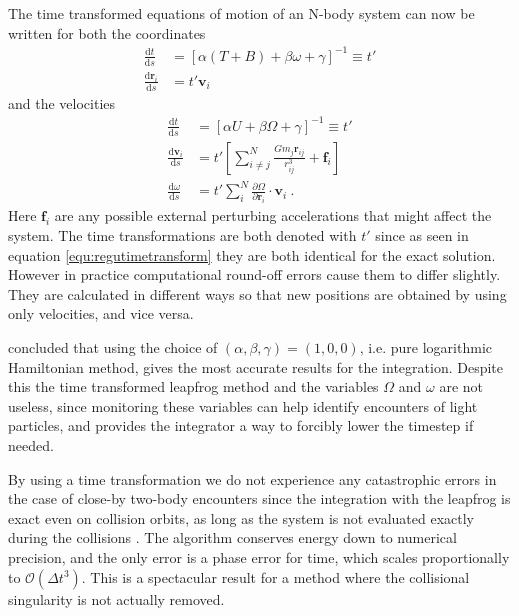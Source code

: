 \documentclass[english, oneside]{HYgradu}
\begin{document}
The time transformed equations of motion of an N-body system can now be written for both the coordinates
\begin{equation}
\begin{aligned}
\frac{\mathrm{d}t}{\mathrm{d}s} &= [\alpha (T + B) + \beta \omega + \gamma]^{-1} \equiv t' \\
\frac{\mathrm{d}\boldsymbol{r}_i}{\mathrm{d}s} &= t' \boldsymbol{v}_i
\end{aligned} \label{equ:tteompositions}
\end{equation}
and the velocities
\begin{equation}
\begin{aligned}
\frac{\mathrm{d}t}{\mathrm{d}s} &= [\alpha U + \beta \Omega + \gamma]^{-1} \equiv t' \\
\frac{\mathrm{d}\boldsymbol{v}_i}{\mathrm{d}s} &= t' \left[ \sum_{i \neq j}^N \frac{G m_j \boldsymbol{r}_{ij}}{r_{ij}^3} + \boldsymbol{f}_i \right] \\
\frac{\mathrm{d} \omega}{\mathrm{d}s} &= t' \sum_i^N \frac{\partial \Omega}{\partial \boldsymbol{r}_i} \cdot \boldsymbol{v}_i \ .
\end{aligned} \label{equ:tteomvelocities}
\end{equation}
Here $\boldsymbol{f}_i$ are any possible external perturbing accelerations that might affect the system. The time transformations are both denoted with $t'$ since as seen in equation \eqref{equ:regutimetransform} they are both identical for the exact solution. However in practice computational round-off errors cause them to differ slightly. They are calculated in different ways so that new positions are obtained by using only velocities, and vice versa.

\cite{mikkola:2008b} concluded that using the choice of $(\alpha, \beta, \gamma) = (1,0,0)$, i.e. pure logarithmic Hamiltonian method, gives the most accurate results for the integration. Despite this the time transformed leapfrog method and the variables $\Omega$ and $\omega$ are not useless, since monitoring these variables can help identify encounters of light particles, and provides the integrator a way to forcibly lower the timestep if needed.

By using a time transformation we do not experience any catastrophic errors in the case of close-by two-body encounters since the integration with the leapfrog is exact even on collision orbits, as long as the system is not evaluated exactly during the collisions \citep{mikkola:1999}. The algorithm conserves energy down to numerical precision, and the only error is a phase error for time, which scales proportionally to $\mathcal{O}(\Delta t^3)$. This is a spectacular result for a method where the collisional singularity is not actually removed.
\end{document}
